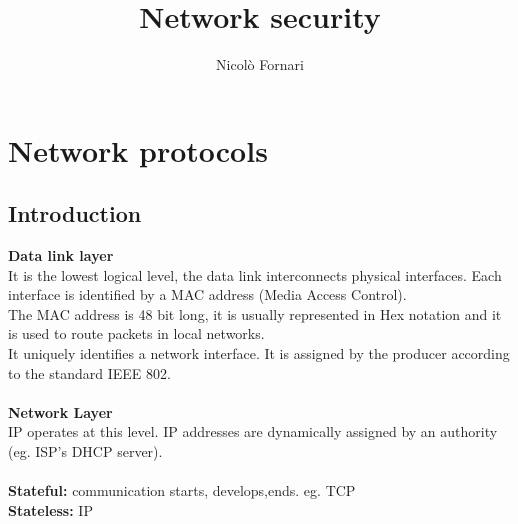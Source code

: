 \documentclass[10pt,a4paper]{book}
\author{Nicolò Fornari}
\title{Network security}
\begin{document}
\maketitle
\chapter{Network protocols}
\section{Introduction}
\textbf{Data link layer}\\
It is the lowest logical level, the data link interconnects physical interfaces. Each interface is identified by a MAC address (Media Access Control).\\
The MAC address is 48 bit long, it is usually represented in Hex notation and it is used to route packets in local networks.\\
It uniquely identifies a network interface. It is assigned by the producer according to the standard IEEE 802.\\\\
\textbf{Network Layer}\\
IP operates at this level. IP addresses are dynamically assigned by an authority (eg. ISP's DHCP server).\\\\
\textbf{Stateful:} communication starts, develops,ends. eg. TCP\\
\textbf{Stateless:} IP\\
\newpage
\end{document}

